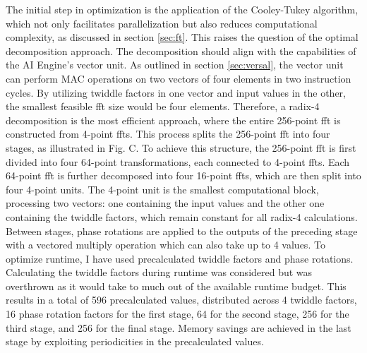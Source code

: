 The initial step in optimization is the application of the Cooley-Tukey algorithm, which not only facilitates parallelization but also reduces computational complexity, as discussed in section \ref{sec:ft}. This raises the question of the optimal decomposition approach. The decomposition should align with the capabilities of the AI Engine's vector unit. As outlined in section \ref{sec:versal}, the vector unit can perform MAC operations on two vectors of four elements in two instruction cycles. By utilizing twiddle factors in one vector and input values in the other, the smallest feasible \ac{fft} size would be four elements. Therefore, a radix-4 decomposition is the most efficient approach, where the entire 256-point \ac{fft} is constructed from 4-point \ac{fft}s. This process splits the 256-point \ac{fft} into four stages, as illustrated in Fig. C. To achieve this structure, the 256-point \ac{fft} is first divided into four 64-point transformations, each connected to 4-point \ac{fft}s. Each 64-point \ac{fft} is further decomposed into four 16-point \ac{fft}s, which are then split into four 4-point units. The 4-point unit is the smallest computational block, processing two vectors: one containing the input values and the other one containing the twiddle factors, which remain constant for all radix-4 calculations. Between stages, phase rotations are applied to the outputs of the preceding stage with a vectored multiply operation which can also take up to 4 values. To optimize runtime, I have used precalculated twiddle factors and phase rotations. Calculating the twiddle factors during runtime was considered but was overthrown as it would take to much out of the available runtime budget. This results in a total of 596 precalculated values, distributed across 4 twiddle factors, 16 phase rotation factors for the first stage, 64 for the second stage, 256 for the third stage, and 256 for the final stage. Memory savings are achieved in the last stage by exploiting periodicities in the precalculated values.\par
